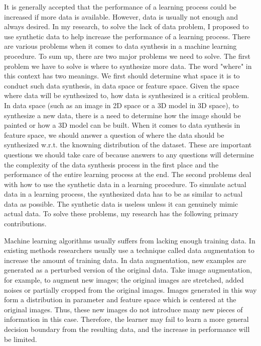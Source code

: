 \documentclass{iitthesis}
\begin{document}
It is generally accepted that the performance of a learning process could be increased if more data is available. However, data is usually not enough and always desired. In my research, to solve the lack of data problem, I proposed to use synthetic data to help increase the performance of a learning process. There are various problems when it comes to data synthesis in a machine learning procedure. To sum up, there are two major problems we need to solve. The first problem we have to solve is where to synthesize more data. The word "where" in this context has two meanings. We first should determine what space it is to conduct such data synthesis, in data space or feature space. Given the space where data will be synthesized to, how data is synthesized is a critical problem. In data space (such as an image in 2D space or a 3D model in 3D space), to synthesize a new data, there is a need to determine how the image should be painted or how a 3D model can be built. When it comes to data synthesis in feature space, we should answer a question of where the data should be synthesized w.r.t. the knowning distribution of the dataset. These are important questions we should take care of because answers to any questions will determine the complexity of the data synthesis process in the first place and the performance of the entire learning process at the end. The second problems deal with how to use the synthetic data in a learning procedure. To simulate actual data in a learning process, the synthesized data has to be as similar to actual data as possible. The synthetic data is useless unless it can genuinely mimic actual data. To solve these problems, my research has the following primary contributions.

 Machine learning algorithms usually suffers from lacking enough training data. In existing methods researchers usually use a technique called data augmentation to increase the amount of training data. In data augmentation, new examples are generated as a perturbed version of the original data. Take image augmentation, for example, to augment new images; the original images are stretched, added noises or partially cropped from the original images. Images generated in this way form a distribution in parameter and feature space which is centered at the original images. Thus, these new images do not introduce many new pieces of information in this case. Therefore, the learner may fail to learn a more general decision boundary from the resulting data, and the increase in performance will be limited.
\end{document}
